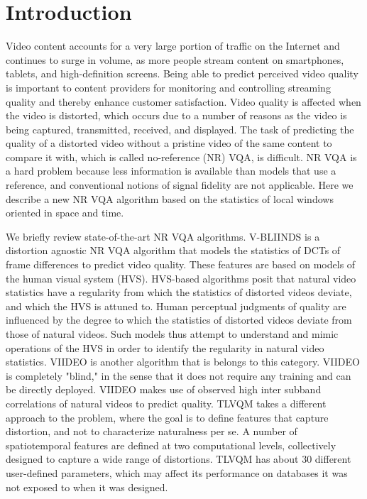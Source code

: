 \documentclass[conference]{IEEEtran}
\begin{document}
\section{Introduction}
Video content accounts for a very large portion of traffic on the Internet and continues to surge in volume, as more people stream content on smartphones, tablets, and high-definition screens. Being able to predict  perceived video quality is important to content providers for monitoring and controlling streaming quality and thereby enhance customer satisfaction. Video quality is affected when the video is distorted, which occurs due to a number of reasons as the video is being captured, transmitted, received, and displayed. The task of predicting the quality of a distorted video without a pristine video of the same content to compare it with, which is called no-reference (NR) VQA, is difficult. NR VQA is a hard problem because less information is available than models that use a reference, and conventional notions of signal fidelity are not applicable. Here we describe a new NR VQA algorithm based on the statistics of local windows oriented in space and time. 

 We briefly review state-of-the-art NR VQA algorithms. V-BLIINDS\cite{vbliinds} is a distortion agnostic NR VQA algorithm that models the statistics of DCTs of frame differences to predict video quality. These features are based on models of the human visual system (HVS). HVS-based algorithms posit that natural video statistics have a regularity from which the statistics of distorted videos deviate, and which the HVS is attuned to. Human perceptual judgments of quality are influenced by the degree to which the statistics of distorted videos deviate from those of natural videos. Such models thus attempt to understand and mimic operations of the HVS in order to identify the regularity in natural video statistics. VIIDEO\cite{viideo} is another algorithm that is belongs to this category. VIIDEO is completely "blind," in the sense that it does not require any training and can be directly deployed. VIIDEO makes use of observed high inter subband correlations of natural videos to predict quality. TLVQM\cite{tlvqm} takes a different approach to the problem, where the goal is to define features that capture distortion, and not to characterize naturalness per se. A number of spatiotemporal features are defined  at two computational levels, collectively designed to capture a wide range of distortions. TLVQM has about 30 different user-defined parameters, which may affect its performance on databases it was not exposed to when it was designed. 
\end{document}
